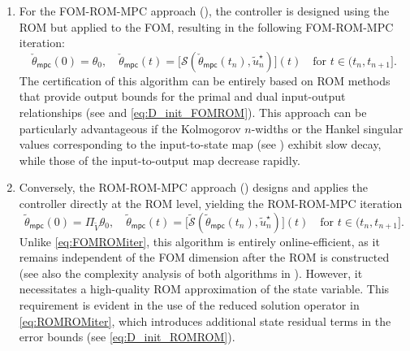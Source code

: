 \documentclass[reqno]{amsart}
\newcommand{\ReA}[1]{{\color{black}#1}}
\newcommand{\state}{\theta}
\newcommand{\inpVar}{u}
\newcommand{\solper}{\calS}
\newcommand{\reduce}[1]{\tilde{#1}}
\newcommand{\Vred}{\reduce{V}}
\newcommand{\projVred}{\Pi_{\Vred}}
\newcommand{\stateRed}{\reduce{\state}}
\newcommand{\optInpVarRed}[1]{\reduce{\inpVar}_{#1}^\star}
\newcommand{\optInpVarRedN}{\optInpVarRed{n}}
\newcommand{\intermediateStateMPC}
{\check{\state}_{\mathsf{mpc}}}
\newcommand{\stateRedMPC}{{\stateRed}_{\mathsf{mpc}}}
\newcommand{\calS}{\mathcal{S}}
\newcommand{\abbr}[1]{\textsf{#1}\xspace}
\newcommand{\FOM}{\abbr{FOM}}
\newcommand{\ROM}{\abbr{ROM}}
\newcommand{\MPC}{\abbr{MPC}}
\begin{document}
%
\begin{enumerate}
    \item For the \FOM-\ROM-\MPC approach (), the controller is designed using the \ROM but applied to the \FOM, resulting in the following \FOM-\ROM-\MPC iteration:
    \begin{equation}\label{eq:FOMROMiter}
        \intermediateStateMPC(0)=\theta_0 ,\quad \intermediateStateMPC(t)=\big[\solper(\intermediateStateMPC(t_{n}),\optInpVarRedN)\big](t)\quad \text{for }t\in (t_{n},t_{n+1}].
    \end{equation}
    The certification of this algorithm can be entirely based on \ROM methods that provide output bounds for the primal and dual input-output relationships (see  and \eqref{eq:D_init_FOMROM}). This approach can be particularly advantageous if the Kolmogorov $n$-widths or the Hankel singular values corresponding to the input-to-state map (see \cite{Kolmogoroff1936,Unger2019}) exhibit slow decay, while those of the input-to-output map decrease rapidly.
    \item Conversely, the \ROM-\ROM-\MPC approach () designs and applies the controller directly at the \ROM level, yielding the \ROM-\ROM-\MPC iteration
    \begin{equation}\label{eq:ROMROMiter}
        \stateRedMPC(0)=\projVred\theta_0 ,\quad \stateRedMPC(t)=\big[\reduce\solper(\stateRedMPC(t_{n}),\optInpVarRedN)\big](t)\quad \text{for }t\in (t_{n},t_{n+1}].
    \end{equation}
    Unlike \eqref{eq:FOMROMiter}, this algorithm is entirely online-efficient, as it remains independent of the \FOM dimension after the \ROM is constructed \ReA{(see also the complexity analysis of both algorithms in \Cref{app:sec_complexity})}. However, it necessitates a high-quality \ROM approximation of the state variable. This requirement is evident in the use of the reduced solution operator in \eqref{eq:ROMROMiter}, which introduces additional state residual terms in the error bounds (see \eqref{eq:D_init_ROMROM}).
\end{enumerate}
%
%
\end{document}
